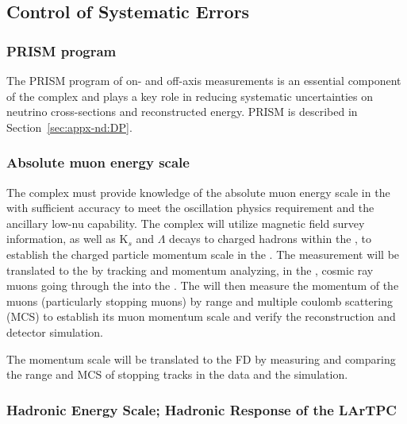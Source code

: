 \subsection{Control of Systematic Errors}

\subsubsection{PRISM program}

The PRISM program of on- and off-axis measurements is an essential component of the   complex and plays a key role in reducing systematic uncertainties on neutrino cross-sections and reconstructed energy. PRISM is described in Section~\ref{sec:appx-nd:DP}. 


\subsubsection{Absolute muon energy scale}

The   complex must provide knowledge of the absolute muon energy scale in the \larnd with sufficient accuracy to meet the oscillation physics requirement %
and the ancillary low-nu capability. %
The complex will utilize  magnetic field survey information, %
as well as K$_{s}$ and $\Lambda$ decays to charged hadrons %
within the , to establish the charged particle momentum scale in the . 
The measurement will be translated to the \larnd by tracking and momentum analyzing, in the , cosmic ray muons going through the  into the \larnd{}. %
The \larnd will then measure the momentum of the muons (particularly stopping muons) by range and multiple coulomb scattering (MCS) to establish its muon momentum scale and verify the reconstruction and detector simulation. 

The momentum scale will be translated to the FD by measuring and comparing the range and MCS of stopping tracks in the data and the simulation.


\subsubsection{Hadronic Energy Scale; Hadronic Response of the LArTPC}

